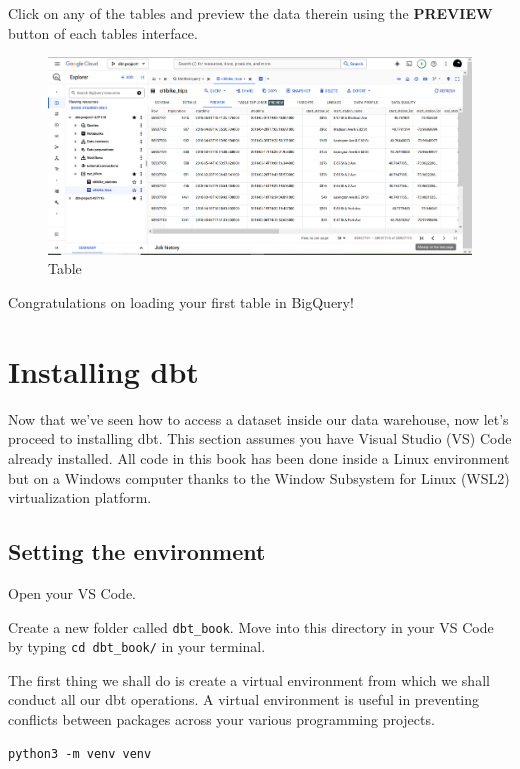 \documentclass[
]{book}
\begin{document}
Click on any of the tables and preview the data therein using the \textbf{PREVIEW} button of each tables interface.

\begin{figure}
\centering
\includegraphics{./images/table_interface.png}
\caption{Table}
\end{figure}

Congratulations on loading your first table in BigQuery!

\hypertarget{installing-dbt}{%
\chapter{Installing dbt}\label{installing-dbt}}

Now that we've seen how to access a dataset inside our data warehouse, now let's proceed to installing dbt. This section assumes you have Visual Studio (VS) Code already installed. All code in this book has been done inside a Linux environment but on a Windows computer thanks to the Window Subsystem for Linux (WSL2) virtualization platform.

\hypertarget{setting-the-environment}{%
\section{Setting the environment}\label{setting-the-environment}}

Open your VS Code.

Create a new folder called \texttt{dbt\_book}. Move into this directory in your VS Code by typing \texttt{cd\ dbt\_book/} in your terminal.

The first thing we shall do is create a virtual environment from which we shall conduct all our dbt operations. A virtual environment is useful in preventing conflicts between packages across your various programming projects.

\begin{verbatim}
python3 -m venv venv
\end{verbatim}
\end{document}
